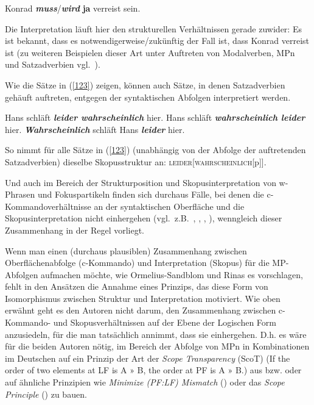 \begin{exe}
	\ex\label{122} 
	Konrad \textit{\textbf{muss}}/\textit{\textbf{wird}} \textbf{ja} verreist sein.
			\hfill\hbox{\citet[100]{Doherty1987}}
\end{exe}
Die Interpretation läuft hier den strukturellen Verhältnissen gerade zuwider: Es ist bekannt, dass es notwendigerweise/zukünftig der Fall ist, dass Konrad verreist ist (zu weiteren Beispielen dieser Art unter Auftreten von Modalverben, MPn und Satzadverbien vgl.\ \citealt[121--128]{Doherty1985}).				

Wie die Sätze in (\ref{123}) zeigen, können auch Sätze, in denen Satzadverbien  gehäuft auftreten, entgegen der syntaktischen Abfolgen interpretiert werden.

\begin{exe}
	\ex\label{123} 
		\begin{xlist}	
			\ex\label{123a} Hans schläft \textit{\textbf{leider wahrscheinlich}} hier.
			\ex\label{123b} Hans schläft \textit{\textbf{wahrscheinlich leider}} hier.
			\ex\label{123c} \textit{\textbf{Wahrscheinlich}} schläft Hans \textit{\textbf{leider}} hier.
			\hfill\hbox{\citet[205]{Lang1979}}
		\end{xlist}
\end{exe}
So nimmt \citet[205]{Lang1979} für alle Sätze in (\ref{123}) (unabhängig von der Abfolge der auftretenden Satzadverbien) dieselbe Skopusstruktur  an: \textsc{leider}[\textsc{wahrschein\-lich}[p]].

Und auch im Bereich der Strukturposition und Skopusinterpretation von w-Phrasen und Fokuspartikeln finden sich durchaus Fälle, bei denen die c-Komman\-doverhältnisse an der syntaktischen Oberfläche und die Skopusinterpretation nicht einhergehen (vgl.\ z.B.\ \citealt[94]{Reis1992}, \citealt[29--30]{Brandt1992b}, \citealt[167]{Lohnstein2000}, \citealt[54]{Hoeksema1991}), wenngleich dieser Zusammenhang in der Regel vorliegt.

Wenn man einen (durchaus plausiblen) Zusammenhang zwischen Oberflächenabfolge (c-Kommando) und Interpretation (Skopus) für die MP-Abfolgen aufmachen möchte, wie Ormelius-Sandblom und Rinas es vorschlagen, fehlt in den Ansätzen die Annahme eines Prinzips, das diese Form von Isomorphismus  zwischen Struktur und Interpretation motiviert. Wie oben erwähnt geht es den Autoren nicht darum, den Zusammenhang zwischen c-Kommando- und Skopusverhältnissen auf der Ebene der Logischen Form anzusiedeln, für die man tatsächlich annimmt, dass sie einhergehen. D.h. es wäre für die beiden Autoren nötig, im Bereich der Abfolge von MPn in Kombinationen im Deutschen auf ein Prinzip der Art der \textit{Scope Transparency} (ScoT)  (If the order of two elements at LF is A » B, the order at PF is A » B.) aus \citet[92]{Wurmbrandt2008} bzw. \citet[373]{Wurmbrandt2012} oder auf ähnliche Prinzipien wie \textit{Minimize (PF:LF) Mismatch} (\citealt{Bobaljik1995, Bobaljik2002}) oder das \textit{Scope Principle} (\citealt{Diesing1997}) zu bauen.\\\largerpage

